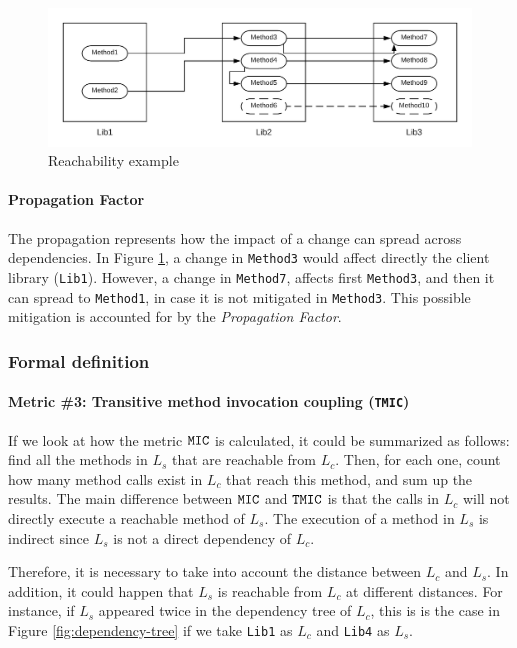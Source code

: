 \begin{figure}[ht]
\begin{center}
\includegraphics[width=\textwidth]{figures/Reachability.png}
\caption{Reachability example}
\label{fig:reachability}
\end{center}
\end{figure}

\paragraph{Propagation Factor}
The propagation represents how the impact of a change can spread across dependencies. In Figure \ref{fig:reachability}, a change in \texttt{Method3} would affect directly the client  library (\texttt{Lib1}). However, a change in \texttt{Method7}, affects first \texttt{Method3}, and then it can spread to \texttt{Method1}, in case it is not mitigated in \texttt{Method3}. This possible mitigation is accounted for by the \textit{Propagation Factor}.

\subsubsection{Formal definition}

\paragraph{Metric \#3: Transitive method invocation coupling (\texttt{TMIC})}
If we look at how the metric $\verb|MIC|$ is calculated, it could be summarized as follows: find all the methods in $L_s$ that are reachable from $L_c$. Then, for each one, count how many method calls exist in $L_c$ that reach this method, and sum up the results. The main difference between $\verb|MIC|$ and $\verb|TMIC|$ is that the calls in $L_c$ will not directly execute a reachable method of $L_s$. The execution of a method in $L_s$ is indirect since $L_s$ is not a direct dependency of $L_c$.

Therefore, it is necessary to take into account the distance between $L_c$ and $L_s$. In addition, it could happen that $L_s$ is reachable from $L_c$ at different distances. For instance, if $L_s$ appeared twice in the dependency tree of $L_c$, this is is the case in Figure \ref{fig:dependency-tree} if we take \texttt{Lib1} as $L_c$ and \texttt{Lib4} as $L_s$.

